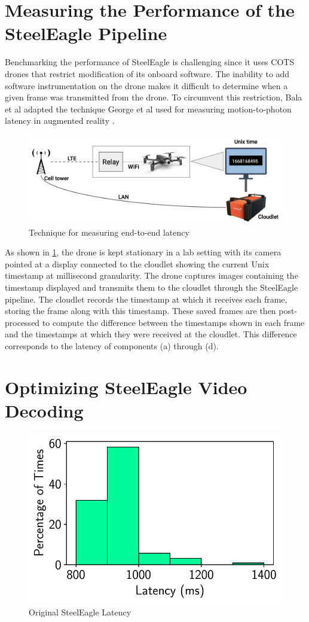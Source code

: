 \section{Measuring the Performance of the SteelEagle Pipeline}
\label{sec:steeleagle-performance-measurement}

Benchmarking the performance of SteelEagle is challenging since it uses COTS
drones that restrict modification of its onboard software. The inability to add
software instrumentation on the drone makes it difficult to determine when a
given frame was transmitted from the drone. To circumvent this restriction,
Bala et al adapted the technique George et al used for measuring
motion-to-photon latency in augmented reality \cite{george20}.


\begin{figure}[htbp]
\centerline{\includegraphics[width = .8\textwidth]{figs/mtp_pipeline.png}}
\caption{Technique for measuring end-to-end latency}
\label{fig:latency-measuring-technique}
\end{figure}
As shown in \cref{fig:latency-measuring-technique}, the drone is kept
stationary in a lab setting with its camera pointed at a display connected to
the cloudlet showing the current Unix timestamp at millisecond granularity. The
drone captures images containing the timestamp displayed and transmits them to
the cloudlet through the SteelEagle pipeline. The cloudlet records the
timestamp at which it receives each frame, storing the frame along with this
timestamp. These saved frames are then
post-processed to compute the difference between the timestamps shown in each
frame and the timestamps at which they were received at the cloudlet. This
difference corresponds to the latency of components (a) through (d).

\section{Optimizing SteelEagle Video Decoding}
\label{sec:exp1}

\begin{figure}[htbp]
\centerline{\includegraphics[width = .4\textwidth]{figs/bala_latency.pdf}}
\caption{Original SteelEagle Latency \cite{bala2024}}
\label{fig:steeleagle-original-latency}
\end{figure}

